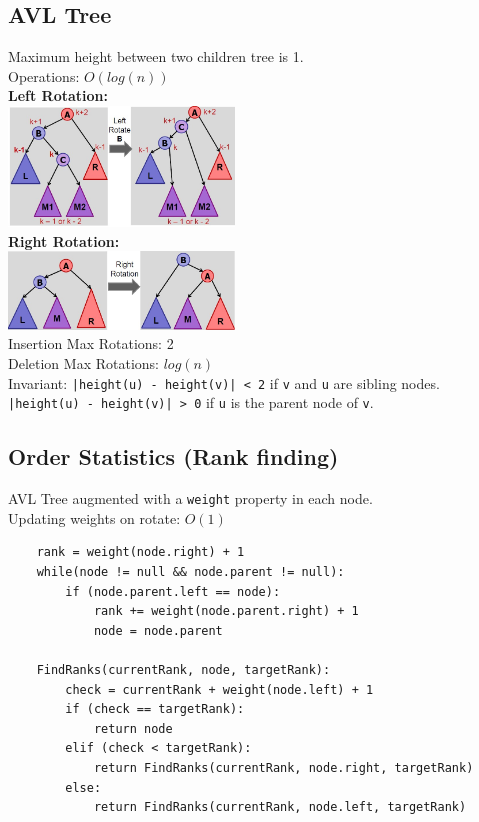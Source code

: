 \documentclass[10pt,landscape,a4paper]{article}
\begin{document}
\begin{multicols*}{4}
\subsection{AVL Tree}
Maximum height between two children tree is 1. \\
Operations: $O(log(n))$ \\
\textbf{Left Rotation:} \\
\includegraphics[width = 6cm]{left-rotate} \\
\textbf{Right Rotation:} \\
\includegraphics[width = 6cm]{right-rotate} \\
Insertion Max Rotations: 2 \\
Deletion Max Rotations: $log(n)$ \\
Invariant: \texttt{|height(u) - height(v)| < 2} if \texttt{v} and \texttt{u} are sibling nodes. \texttt{|height(u) - height(v)| > 0} if \texttt{u} is the parent node of \texttt{v}.

\subsection{Order Statistics (Rank finding)}
AVL Tree augmented with a \texttt{weight} property in each node. \\
Updating weights on rotate: $O(1)$ \\

\begin{lstlisting}
    rank = weight(node.right) + 1
    while(node != null && node.parent != null):
	    if (node.parent.left == node):
		    rank += weight(node.parent.right) + 1
		    node = node.parent

    FindRanks(currentRank, node, targetRank):
	    check = currentRank + weight(node.left) + 1
	    if (check == targetRank):
		    return node
	    elif (check < targetRank):
		    return FindRanks(currentRank, node.right, targetRank)
	    else:
		    return FindRanks(currentRank, node.left, targetRank)
\end{lstlisting}


\end{multicols*}
\end{document}
